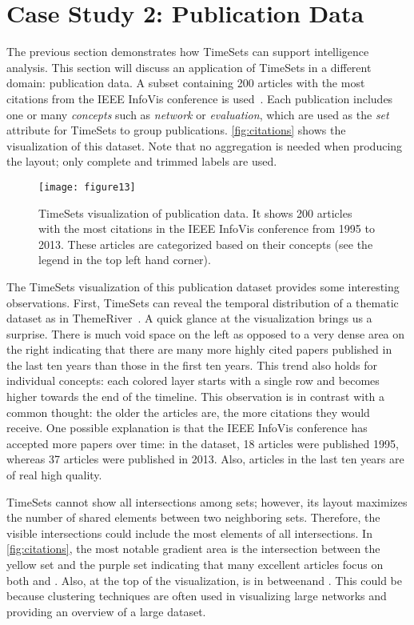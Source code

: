 \section{Case Study 2: Publication Data}
\label{sub:ts-pub}
The previous section demonstrates how TimeSets can support intelligence analysis. This section will discuss an application of TimeSets in a different domain: publication data. A subset containing 200 articles with the most citations from the IEEE InfoVis conference is used~\cite{Stasko2013}. Each publication includes one or many \emph{concepts} such as \emph{network} or \emph{evaluation}, which are used as the \emph{set} attribute for TimeSets to group publications. \autoref{fig:citations} shows the visualization of this dataset. Note that no aggregation is needed when producing the layout; only complete and trimmed labels are used.

\begin{sidewaysfigure}[p]
\centering
\texttt{[image: figure13]}
\caption[TimeSets visualization of publication data]{TimeSets visualization of publication data. It shows 200 articles with the most citations in the IEEE InfoVis conference from 1995 to 2013. These articles are categorized based on their concepts (see the legend in the top left hand corner).}
\label{fig:citations}
\end{sidewaysfigure}

The TimeSets visualization of this publication dataset provides some interesting observations. First, TimeSets can reveal the temporal distribution of a thematic dataset as in ThemeRiver~\cite{Havre2002}. A quick glance at the visualization brings us a surprise. There is much void space on the left as opposed to a very dense area on the right indicating that there are many more highly cited papers published in the last ten years than those in the first ten years. This trend also holds for individual concepts: each colored layer starts with a single row and becomes higher towards the end of the timeline. This observation is in contrast with a common thought: the older the articles are, the more citations they would receive. One possible explanation is that the IEEE InfoVis conference has accepted more papers over time: in the dataset, 18 articles were published 1995, whereas 37 articles were published in 2013. Also, articles in the last ten years are of real high quality.

TimeSets cannot show all intersections among sets; however,  its layout maximizes the number of shared elements between two neighboring sets. Therefore, the visible intersections could include the most elements of all intersections. In \autoref{fig:citations}, the most notable gradient area is the intersection between the yellow set and the purple set indicating that many excellent articles focus on both \tsevaluation{} and \tsinteraction. Also, at the top of the visualization, \tsclustering{} is in between\tsnetwork and \tsoverview{}. This could be because clustering techniques are often used in visualizing large networks and providing an overview of a large dataset.

